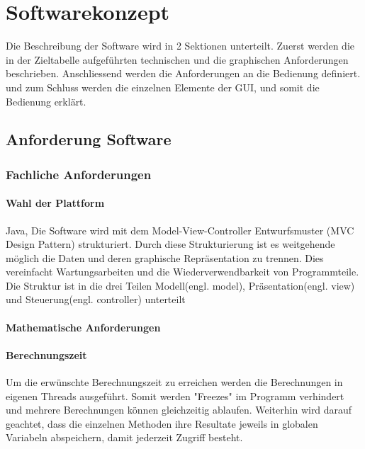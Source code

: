 \section{Softwarekonzept} \label{sec:softwarekonzept}

Die Beschreibung der Software wird in 2 Sektionen unterteilt. Zuerst werden die in der Zieltabelle aufgeführten technischen und die graphischen Anforderungen beschrieben.  Anschliessend werden die Anforderungen an die Bedienung definiert. und zum Schluss werden die einzelnen Elemente der GUI, und somit die Bedienung erklärt.

\subsection{Anforderung Software} \label{subsec:anforderungSoftware}


\subsubsection{Fachliche Anforderungen} \label{subsubsec:fachlicheanforderungen}

\bigskip
{}
\paragraph{Wahl der Plattform} \label{para:wahlderplattform}
Java, Die Software wird mit dem Model-View-Controller Entwurfsmuster (MVC Design Pattern) \cite{MVCDesignPattern} strukturiert. Durch diese Strukturierung ist es weitgehende möglich die Daten und deren graphische Repräsentation zu trennen. Dies vereinfacht Wartungsarbeiten und die Wiederverwendbarkeit von Programmteile. Die Struktur ist in die drei Teilen Modell(engl. model), Präsentation(engl. view) und Steuerung(engl. 		controller) unterteilt

\bigskip
\paragraph{Mathematische Anforderungen}\label{para:mathematischeanforderungen}
\bigskip
\paragraph{Berechnungszeit}\label{para:berechnungszeit}
Um die erwünschte Berechnungszeit zu erreichen werden die Berechnungen in eigenen Threads ausgeführt. Somit werden "Freezes" im Programm verhindert und mehrere Berechnungen können gleichzeitig ablaufen. Weiterhin wird darauf geachtet, dass die einzelnen Methoden ihre Resultate jeweils in globalen Variabeln abspeichern, damit jederzeit Zugriff besteht.	
\bigskip
